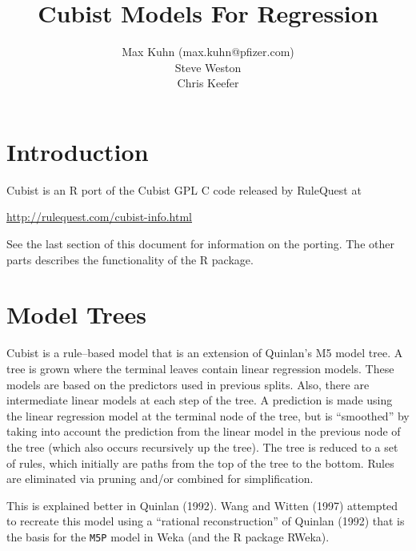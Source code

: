 \documentclass[12pt]{article}
\title{Cubist Models For Regression}
\author{Max Kuhn (max.kuhn@pfizer.com) \\ Steve Weston \\ Chris Keefer}
\newcommand{\code}[1]{\mbox{\footnotesize\color{darkblue}\texttt{#1}}}
\newcommand{\pkg}[1]{{\fontseries{b}\selectfont #1}}
\renewcommand{\pkg}[1]{{\textsf{#1}}}
\begin{document}
\maketitle

\thispagestyle{empty}
	
\section{Introduction}

\pkg{Cubist} is an \pkg{R} port of the Cubist GPL \pkg{C} code released by RuleQuest at
\begin{center}
\href{http://rulequest.com/cubist-info.html}{http://rulequest.com/cubist-info.html}  
\end{center}
See the last section of this document for information on the porting. The other parts describes the functionality of the \pkg{R} package.


\section{Model Trees}

Cubist is a rule--based model that is an extension of Quinlan's M5 model tree. A tree is grown where the terminal leaves contain linear regression models. These models are based on the predictors used in previous splits.  Also, there are intermediate linear models at each step of the tree. A prediction is made using the linear regression model at the terminal node of the tree, but is ``smoothed'' by taking into account the prediction from the linear model in the previous node of the tree (which also occurs recursively up the tree). The tree is reduced to a set of rules, which initially are paths from the top of the tree to the bottom. Rules are eliminated via pruning and/or combined for simplification. 

This is explained better in Quinlan (1992). Wang and Witten (1997) attempted to recreate this model using a ``rational reconstruction'' of Quinlan (1992) that is the basis for the \code{M5P} model in \pkg{Weka} (and the R package \pkg{RWeka}).
\end{document}
